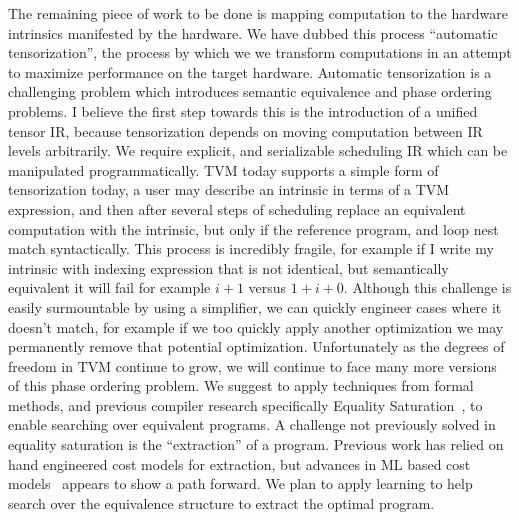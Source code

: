 The remaining piece of work to be done is mapping
    computation to the hardware intrinsics manifested by the hardware.
We have dubbed this process ``automatic tensorization'', the process by which we
    we transform computations in an attempt to maximize performance on the target
    hardware.
Automatic tensorization is a challenging problem which introduces
    semantic equivalence and phase ordering problems.
I believe the first step towards this is the introduction of a unified
    tensor IR, because tensorization depends on moving computation between
    IR levels arbitrarily.
We require explicit, and serializable scheduling IR which can be manipulated
    programmatically.
TVM today supports a simple form of tensorization today, a user may describe
    an intrinsic in terms of a TVM expression, and then after several steps
    of scheduling replace an equivalent computation with the intrinsic,
    but only if the reference program, and loop nest match syntactically.
This process is incredibly fragile, for example if I write my intrinsic with
    indexing expression that is not identical, but semantically equivalent
    it will fail for example $i + 1$ versus $1 + i + 0$.
Although this challenge is easily surmountable by using a simplifier,
    we can quickly engineer cases where it doesn't match, for example
    if we too quickly apply another optimization we may permanently
    remove that potential optimization.
Unfortunately as the degrees of freedom in TVM continue to grow, we
    will continue to face many more versions of this phase ordering
    problem.
We suggest to apply techniques from formal methods, and previous compiler
    research specifically Equality Saturation~\citep{eqsat}, to enable searching
    over equivalent programs.
A challenge not previously solved in equality saturation is the ``extraction''
    of a program.
Previous work has relied on hand engineered cost models for extraction, but
    advances in ML based cost models~\citep{autotvm} appears to show a path
    forward.
We plan to apply learning to help search over the equivalence structure to
    extract the optimal program.
